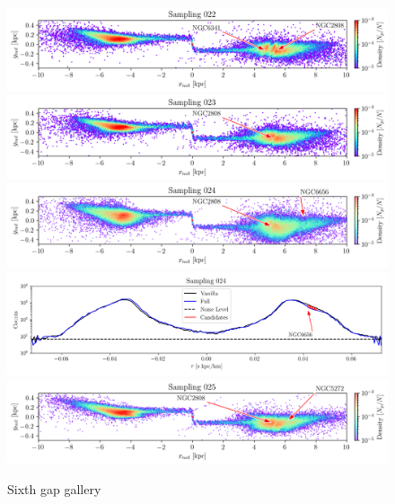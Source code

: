\documentclass[draft]{aa}
\begin{document}
\begin{appendix}
    \begin{figure}
      \centering
      \includegraphics[width=\linewidth]{gallery_of_gaps_monte-carlo-022.png}
      \includegraphics[width=\linewidth]{gallery_of_gaps_monte-carlo-023.png}
      \includegraphics[width=\linewidth]{gallery_of_gaps_monte-carlo-024.png}   
      \includegraphics[width=\linewidth]{tau-profile-monte-carlo-024.png}
      \includegraphics[width=\linewidth]{gallery_of_gaps_monte-carlo-025.png}
      \caption{Sixth gap gallery}
      \label{fig:gallery5}
      \end{figure}        


\end{appendix}
\end{document}
